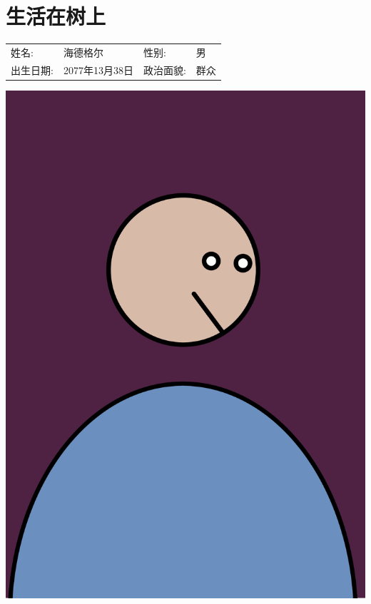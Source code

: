 \documentclass{cv}
\begin{document}
\noindent\begin{minipage}[t]{0.73\textwidth}
	\vspace{0pt} %
	\section[$\bullet$]{生活在树上}
	\begin{tabular}{p{2cm}p{4cm}p{2cm}p{2cm}}
		姓名:   & 海德格尔        & 性别:   & 男  \\
		出生日期: & 2077年13月38日 & 政治面貌: & 群众 \\
	\end{tabular}
\end{minipage}\hfill
\begin{minipage}[t]{0.23\textwidth}
	\vspace{0pt} %
	\includegraphics[width=\linewidth]{figures/avatar}
\end{minipage}
\end{document}
